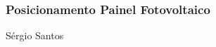 \begin{frame}
\frametitle{Posicionamento Painel Fotovoltaico}

\vfill
\hfill {\tiny Sérgio Santos}
\end{frame}
